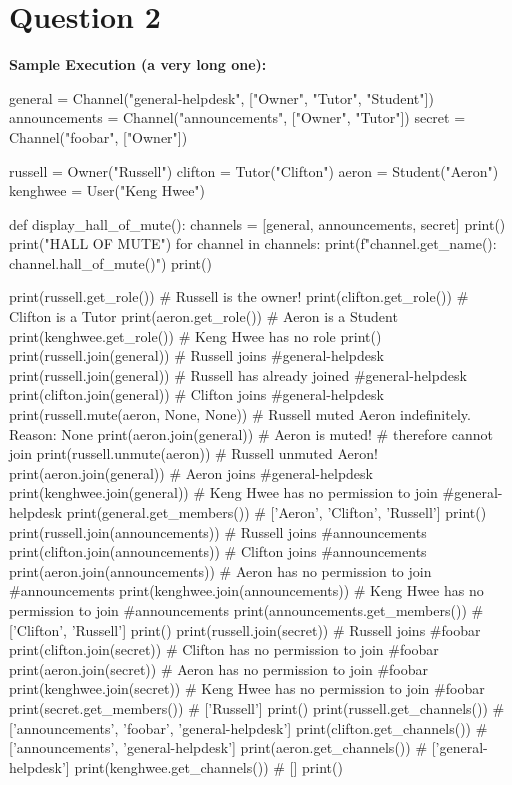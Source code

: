 \section{Question 2}
\textbf{Sample Execution (a very long one):}
\begin{python}
general = Channel("general-helpdesk", ["Owner", "Tutor", "Student"])
announcements = Channel("announcements", ["Owner", "Tutor"])
secret = Channel("foobar", ["Owner"])

russell = Owner("Russell")
clifton = Tutor("Clifton")
aeron = Student("Aeron")
kenghwee = User("Keng Hwee")

def display_hall_of_mute():
    channels = [general, announcements, secret]
    print()
    print("HALL OF MUTE")
    for channel in channels:
        print(f"{channel.get_name()}: {channel.hall_of_mute()}")
    print()

print(russell.get_role())               # Russell is the owner!
print(clifton.get_role())               # Clifton is a Tutor
print(aeron.get_role())                 # Aeron is a Student
print(kenghwee.get_role())              # Keng Hwee has no role
print()
print(russell.join(general))            # Russell joins #general-helpdesk
print(russell.join(general))            # Russell has already joined #general-helpdesk
print(clifton.join(general))            # Clifton joins #general-helpdesk
print(russell.mute(aeron, None, None))  # Russell muted Aeron indefinitely. Reason: None
print(aeron.join(general))              # Aeron is muted!
                                        # therefore cannot join
print(russell.unmute(aeron))            # Russell unmuted Aeron!
print(aeron.join(general))              # Aeron joins #general-helpdesk
print(kenghwee.join(general))           # Keng Hwee has no permission to join #general-helpdesk
print(general.get_members())            # ['Aeron', 'Clifton', 'Russell']
print()
print(russell.join(announcements))      # Russell joins #announcements
print(clifton.join(announcements))      # Clifton joins #announcements
print(aeron.join(announcements))        # Aeron has no permission to join #announcements
print(kenghwee.join(announcements))     # Keng Hwee has no permission to join #announcements
print(announcements.get_members())      # ['Clifton', 'Russell']
print()
print(russell.join(secret))             # Russell joins #foobar
print(clifton.join(secret))             # Clifton has no permission to join #foobar
print(aeron.join(secret))               # Aeron has no permission to join #foobar
print(kenghwee.join(secret))            # Keng Hwee has no permission to join #foobar
print(secret.get_members())             # ['Russell']
print()
print(russell.get_channels())           # ['announcements', 'foobar', 'general-helpdesk']
print(clifton.get_channels())           # ['announcements', 'general-helpdesk']
print(aeron.get_channels())             # ['general-helpdesk']
print(kenghwee.get_channels())          # []
print()


\end{python}
